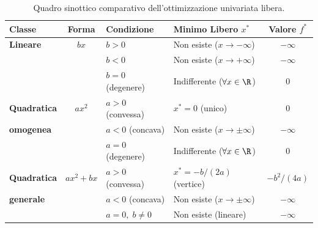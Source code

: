 \begin{table}[H]
\centering
\small
\renewcommand{\arraystretch}{1.3}
\begin{tabularx}{\textwidth}{l c l X c}
\toprule
\textbf{Classe} & \textbf{Forma} & \textbf{Condizione} & \textbf{Minimo Libero $x^*$} & \textbf{Valore $f^*$} \\
\midrule
\textbf{Lineare} & $bx$ & $b > 0$ & Non esiste ($x \to -\infty$) & $-\infty$ \\
                 &      & $b < 0$ & Non esiste ($x \to +\infty$) & $-\infty$ \\
                 &      & $b = 0$ (degenere) & Indifferente ($\forall x \in \R$) & $0$ \\
\midrule
\textbf{Quadratica} & $ax^2$ & $a > 0$ (convessa) & $x^* = 0$ (unico) & $0$ \\
\textbf{omogenea}   &        & $a < 0$ (concava)  & Non esiste ($x \to \pm\infty$) & $-\infty$ \\
                    &        & $a = 0$ (degenere) & Indifferente ($\forall x \in \R$) & $0$ \\
\midrule
\textbf{Quadratica} & $ax^2 + bx$ & $a > 0$ (convessa) & $x^* = -b/(2a)$ (vertice) & $-b^2/(4a)$ \\
\textbf{generale}   &             & $a < 0$ (concava)  & Non esiste ($x \to \pm\infty$) & $-\infty$ \\
                    &             & $a = 0, \; b \neq 0$  & Non esiste (lineare) & $-\infty$ \\
\bottomrule
\end{tabularx}
\caption{Quadro sinottico comparativo dell'ottimizzazione univariata libera.}
\label{tab:sinottico-univariato}
\end{table}

